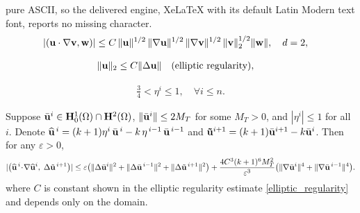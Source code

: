 \documentclass[10pt,a4paper]{amsart}
\begin{document}
pure ASCII, so the delivered engine, XeLaTeX with its default Latin Modern text font, reports no missing character.
\begin{align}
|({\bf u}\cdot\nabla {\bf v}, {\bf w})|
& \le C\,
\|{\bf u}\|^{1/2}\,\|\nabla {\bf u}\|^{1/2} \,
\|\nabla {\bf v}\|^{1/2}\,\| {\bf v}\|_2^{1/2} \|{\bf w}\|,
\quad d=2, 
\label{convection_estimate}
\end{align}

\begin{align}
\|{\bf u}\|_2
&\le C \|\Delta {\bf u} \|
\quad \text{(elliptic regularity)},
\label{elliptic_regularity}
\end{align}

\begin{align}
\tfrac34 < \eta^{i} \le 1, \quad \forall i\le n.
\label{5.9-new}
\end{align}

\begin{lemma}
\label{lemma5.13-new}
Suppose $\bar{\bf u}^i\in {\bf H}^1_0(\Omega)\cap {\bf H}^2(\Omega)$,  
$\|\bar{\bf u}^{i}\| \le 2 M_T$ for some $M_T>0$, and $|\eta^i|\le 1$ for all $i$. 
Denote $\widehat {\bf u}^{\,i}=(k+1)\eta^{i}\,\bar {\bf u}^{\,i}-k\,\eta^{\,i-1}\,\bar {\bf u}^{\,i-1}$
and
${\bf \tilde{u}}^{i+1}=(k+1) {\bar{\bf u}}^{i+1} - k {\bar{\bf u}}^i$. 
Then for any $\varepsilon>0$, 
\begin{align}
|\bigl(\widehat {\bf u}^{\,i}\!\cdot\!\nabla \widehat {\bf u}^{i},\;\Delta\tilde {\bf u}^{\,i+1}\bigr)|
\le 
\varepsilon \big( \|\Delta\bar {\bf u}^i\|^2
+ \|\Delta\bar {\bf u}^{\,i-1}\|^2
+ \|\Delta\tilde {\bf u}^{\,i+1}\|^2 \big)
+  \frac{4C^3(k+1)^6 M_T^2}{\varepsilon^3} \big(\|\nabla\bar {\bf u}^i\|^4+\|\nabla\bar {\bf u}^{\,i-1}\|^4\big).
\label{5.13-new}
\end{align}
where $C$ is constant shown in the elliptic regularity estimate \eqref{elliptic_regularity} and depends only on the domain.

\end{lemma}
\end{document}
